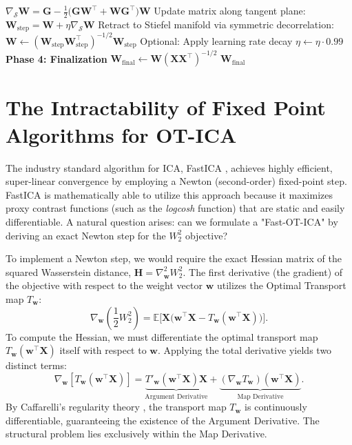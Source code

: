 \documentclass[12pt,a4paper,twoside,openany]{book}
\begin{document}
\begin{algorithm}[H]
\begin{algorithmic}[1]
    \Statex \qquad $\nabla_{\mathcal{S}} \mathbf{W} = \mathbf{G} - \frac{1}{2}\big(\mathbf{G}\mathbf{W}^\top + \mathbf{W}\mathbf{G}^\top \big)\mathbf{W}$
    \State Update matrix along tangent plane:
    \Statex \qquad $\mathbf{W}_{\text{step}} = \mathbf{W} + \eta \nabla_{\mathcal{S}} \mathbf{W}$ 
    \State Retract to Stiefel manifold via symmetric decorrelation: 
    \Statex \qquad $\mathbf{W} \gets (\mathbf{W}_{\text{step}}\mathbf{W}_{\text{step}}^\top)^{-1/2} \mathbf{W}_{\text{step}}$
    \State Optional: Apply learning rate decay $\eta \gets \eta \cdot 0.99$
\EndFor
\State \textbf{Phase 4: Finalization}
\State $\mathbf{W}_{\text{final}} \gets \mathbf{W} (\mathbf{X}\mathbf{X}^\top)^{-1/2}$ 
\State \Return $\mathbf{W}_{\text{final}}$
\end{algorithmic}
\end{algorithm}


\section{The Intractability of Fixed Point Algorithms for OT-ICA}
The industry standard algorithm for ICA, FastICA \cite[Chapter 8]{hyvarinen2001}, achieves highly efficient, super-linear convergence by employing a Newton (second-order) fixed-point step. 
FastICA is mathematically able to utilize this approach because it maximizes proxy contrast functions (such as the \textit{logcosh} function) that are static and easily differentiable. 
A natural question arises: can we formulate a "Fast-OT-ICA" by deriving an exact Newton step for the $W_2^2$ objective? 

To implement a Newton step, we would require the exact Hessian matrix of the squared Wasserstein distance, $\mathbf{H} = \nabla^2_{\mathbf{w}} W_2^2$. 
The first derivative (the gradient) of the objective with respect to the weight vector $\mathbf{w}$ utilizes the Optimal Transport map $T_{\mathbf{w}}$:
\begin{equation}
    \nabla_{\mathbf{w}} \left( \frac{1}{2} W_2^2 \right) = \mathbb{E}\Big[ \mathbf{X} \big( \mathbf{w}^\top \mathbf{X} - T_{\mathbf{w}}(\mathbf{w}^\top \mathbf{X}) \big) \Big].
\end{equation}
To compute the Hessian, we must differentiate the optimal transport map $T_{\mathbf{w}}(\mathbf{w}^\top \mathbf{X})$ itself with respect to $\mathbf{w}$. 
Applying the total derivative yields two distinct terms:
\begin{equation}
    \nabla_{\mathbf{w}} [T_{\mathbf{w}}(\mathbf{w}^\top \mathbf{X})] = \underbrace{T'_{\mathbf{w}}(\mathbf{w}^\top \mathbf{X}) \mathbf{X}}_{\text{Argument Derivative}} + \underbrace{(\nabla_{\mathbf{w}} T_{\mathbf{w}})(\mathbf{w}^\top \mathbf{X})}_{\text{Map Derivative}}.
\end{equation}
By Caffarelli's regularity theory \cite{caffarelli1992}, the transport map $T_{\mathbf{w}}$ is continuously differentiable, guaranteeing the existence of the Argument Derivative. 
The structural problem lies exclusively within the Map Derivative. 
\end{document}
